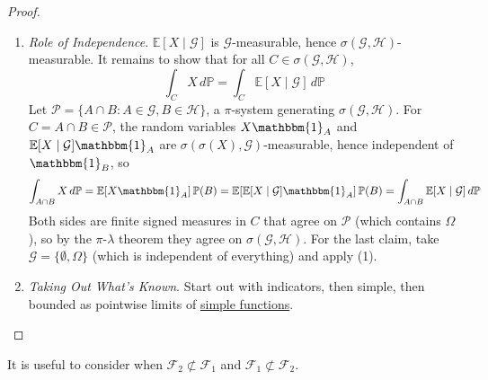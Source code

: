 \begin{proof}
\begin{enumerate}
	    \item \textit{Role of Independence}. $\mathbb{E}[X \mid \mathcal{G}]$ is $\mathcal{G}$-measurable, hence $\sigma(\mathcal{G}, \mathcal{H})$-measurable. It remains to show that for all $C \in \sigma(\mathcal{G}, \mathcal{H})$, 
	    \begin{equation}
	      \int_C X \,d\mathbb{P} = \int_C \mathbb{E}[X \mid \mathcal{G}] \,d\mathbb{P}
	    \end{equation}
	    Let $\mathcal{P} = \{A \cap B : A \in \mathcal{G}, B \in \mathcal{H}\}$, a $\pi$-system generating $\sigma(\mathcal{G}, \mathcal{H})$. For $C = A \cap B \in \mathcal{P}$, the random variables $X \mathbbm{1}_A$ and $\mathbb{E}[X \mid \mathcal{G}] \mathbbm{1}_A$ are $\sigma(\sigma(X), \mathcal{G})$-measurable, hence independent of $\mathbbm{1}_B$, so 
	    \begin{equation}
	      \int_{A \cap B} X \,d\mathbb{P} = \mathbb{E}[X \mathbbm{1}_A] \, \mathbb{P}(B) = \mathbb{E}[\mathbb{E}[X \mid \mathcal{G}] \mathbbm{1}_A] \, \mathbb{P}(B) = \int_{A \cap B} \mathbb{E}[X \mid \mathcal{G}] \,d\mathbb{P}
	    \end{equation}
	    Both sides are finite signed measures in $C$ that agree on $\mathcal{P}$ (which contains $\Omega$), so by the $\pi$-$\lambda$ theorem they agree on $\sigma(\mathcal{G}, \mathcal{H})$. For the last claim, take $\mathcal{G} = \{\emptyset, \Omega\}$ (which is independent of everything) and apply (1). 
	    \item \textit{Taking Out What's Known}. Start out with indicators, then simple, then bounded as pointwise limits of \hyperref[mt-def:simple-functions]{simple functions}. 
	  \end{enumerate}
	\end{proof}

	It is useful to consider when $\mathcal{F}_2 \not\subset \mathcal{F}_1$ and $\mathcal{F}_1 \not\subset \mathcal{F}_2$. 

